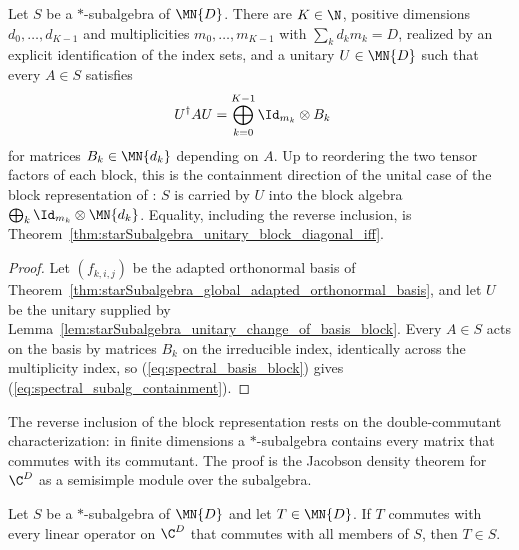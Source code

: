 \begin{theorem}%
    \label{thm:starSubalgebra_unitary_block_diagonal}
    \leanok
    Let $S$ be a $*$-subalgebra of $\MN{D}$. There are $K\in\N$, positive
    dimensions $d_0,\ldots,d_{K-1}$ and multiplicities
    $m_0,\ldots,m_{K-1}$ with $\sum_kd_km_k=D$, realized by an explicit
    identification of the index sets, and a unitary $U\in\MN{D}$ such that
    every $A\in S$ satisfies
    \begin{align}
        U^\dagger A U
        &=\bigoplus_{k=0}^{K-1}\Id_{m_k}\otimes B_k
        \label{eq:spectral_subalg_containment}
    \end{align}
    for matrices $B_k\in\MN{d_k}$ depending on $A$. Up to reordering the
    two tensor factors of each block, this is the containment direction of
    the unital case of the block representation of
    \cite[Theorem~6.14]{Wolf2012Quantum}: $S$ is carried by $U$ into the
    block algebra $\bigoplus_k\Id_{m_k}\otimes\MN{d_k}$. Equality, including
    the reverse inclusion, is
    Theorem~\ref{thm:starSubalgebra_unitary_block_diagonal_iff}.
\end{theorem}

\begin{proof}
    \leanok
    Let $(f_{k,i,j})$ be the adapted orthonormal basis of
    Theorem~\ref{thm:starSubalgebra_global_adapted_orthonormal_basis}, and
    let $U$ be the unitary supplied by
    Lemma~\ref{lem:starSubalgebra_unitary_change_of_basis_block}. Every
    $A\in S$ acts on the basis by matrices $B_k$ on the irreducible index,
    identically across the multiplicity index, so
    (\ref{eq:spectral_basis_block}) gives
    (\ref{eq:spectral_subalg_containment}).
\end{proof}

The reverse inclusion of the block representation rests on the
double-commutant characterization: in finite dimensions a $*$-subalgebra
contains every matrix that commutes with its commutant. The proof is the
Jacobson density theorem for $\C^D$ as a semisimple module over the
subalgebra.

\begin{lemma}%
    \label{lem:starSubalgebra_double_commutant}
    \leanok
    Let $S$ be a $*$-subalgebra of $\MN{D}$ and let $T\in\MN{D}$. If $T$
    commutes with every linear operator on $\C^D$ that commutes with all
    members of $S$, then $T\in S$.
\end{lemma}


